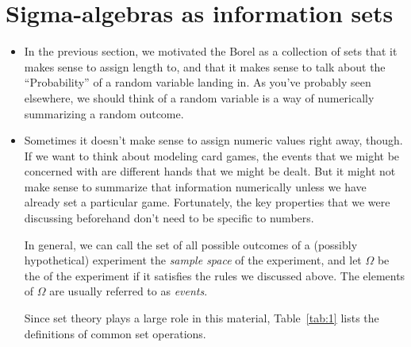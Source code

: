 \section{Sigma-algebras as information sets}

\begin{itemize}[leftmargin=0pt]

\item In the previous section, we motivated the Borel \sigmaalgebra as a
  collection of sets that it makes sense to assign length to, and that
  it makes sense to talk about the ``Probability'' of a random
  variable landing in.  As you've probably seen elsewhere, we should
  think of a random variable is a way of numerically summarizing a
  random outcome.

\item Sometimes it doesn't make sense to assign numeric values right
  away, though.  If we want to think about modeling card games, the
  events that we might be concerned with are different hands that we
  might be dealt.  But it might not make sense to summarize that
  information numerically unless we have already set a particular
  game.  Fortunately, the key properties that we were discussing
  beforehand don't need to be specific to numbers.

  In general, we can call the set of all possible outcomes of a
  (possibly hypothetical) experiment the \emph{sample space} of the
  experiment, and let $\Omega$ be the \emph{\sigmaalgebra} of the experiment if
  it satisfies the rules we discussed above.  The elements of $\Omega$ are
  usually referred to as \emph{events}.

  Since set theory plays a large role in this material,
  Table~\ref{tab:1} lists the definitions of common set operations.


\end{itemize}
